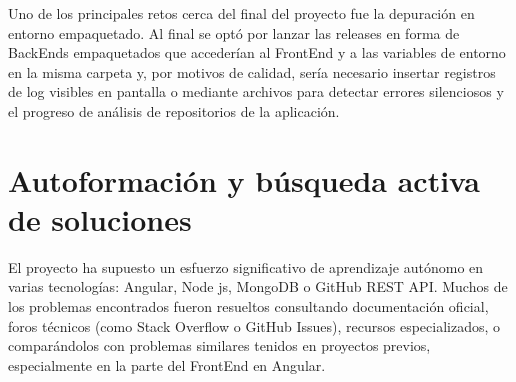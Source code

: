 Uno de los principales retos cerca del final del proyecto fue la depuración en entorno empaquetado. Al final se optó por lanzar las releases en forma de BackEnds empaquetados que accederían al FrontEnd y a las variables de entorno en la misma carpeta y, por motivos de calidad, sería necesario insertar registros de log visibles en pantalla o mediante archivos para detectar errores silenciosos y el progreso de análisis de repositorios de la aplicación.

\section{Autoformación y búsqueda activa de soluciones}

El proyecto ha supuesto un esfuerzo significativo de aprendizaje autónomo en varias tecnologías: Angular, Node js, MongoDB o GitHub REST API. Muchos de los problemas encontrados fueron resueltos consultando documentación oficial, foros técnicos (como Stack Overflow o GitHub Issues), recursos especializados, o comparándolos con problemas similares tenidos en proyectos previos, especialmente en la parte del FrontEnd en Angular.
